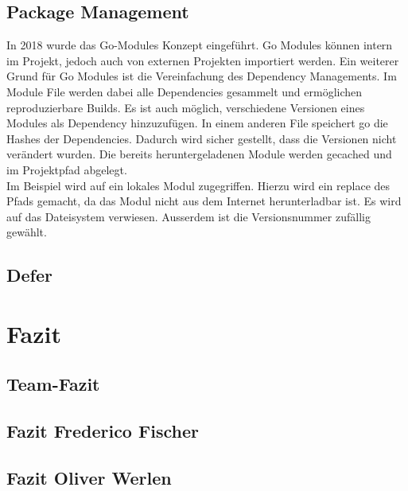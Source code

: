 \documentclass[12pt,titlepage]{article}
\begin{document}
\subsection{Package Management}
In 2018 wurde das Go-Modules Konzept eingeführt. Go Modules können intern im Projekt, jedoch auch von externen Projekten importiert werden. Ein weiterer Grund für Go Modules ist die Vereinfachung des Dependency Managements. Im Module File werden dabei alle Dependencies gesammelt und ermöglichen reproduzierbare Builds. Es ist auch möglich, verschiedene Versionen eines Modules als Dependency hinzuzufügen. In einem anderen File speichert go die Hashes der Dependencies. Dadurch wird sicher gestellt, dass die Versionen nicht verändert wurden. Die bereits heruntergeladenen Module werden gecached und im Projektpfad abgelegt. \\
Im Beispiel wird auf ein lokales Modul zugegriffen. Hierzu wird ein replace des Pfads gemacht, da das Modul nicht aus dem Internet herunterladbar ist. Es wird auf das Dateisystem verwiesen. Ausserdem ist die Versionsnummer zufällig gewählt. 

\subsection{Defer}


\section{Fazit}
\subsection{Team-Fazit}

\subsection{Fazit Frederico Fischer}

\subsection{Fazit Oliver Werlen}

    
\end{document}
